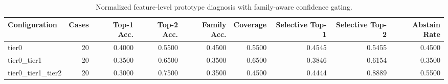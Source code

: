 \begin{table}[t]
\centering
\caption{Normalized feature-level prototype diagnosis with family-aware confidence gating.}
\label{tab:dice_stressor_hierarchical_diagnosis}
\footnotesize
\begin{tabular}{lrrrrrrrr}
\toprule
Configuration & Cases & Top-1 Acc. & Top-2 Acc. & Family Acc. & Coverage & Selective Top-1 & Selective Top-2 & Abstain Rate \\
\midrule
tier0 & 20 & 0.4000 & 0.5500 & 0.4500 & 0.5500 & 0.4545 & 0.5455 & 0.4500 \\
tier0_tier1 & 20 & 0.3500 & 0.6500 & 0.3500 & 0.6500 & 0.3846 & 0.6154 & 0.3500 \\
tier0_tier1_tier2 & 20 & 0.3000 & 0.7500 & 0.3500 & 0.4500 & 0.4444 & 0.8889 & 0.5500 \\
\bottomrule
\end{tabular}

\end{table}
